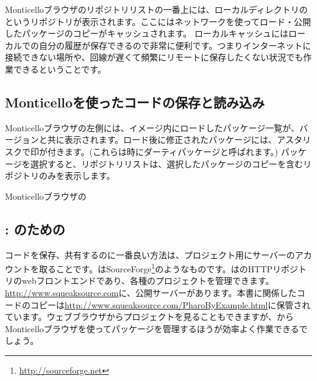 \documentclass[a4paper,10pt,twoside]{book}
\begin{document}
Monticelloブラウザのリポジトリリストの一番上には、ローカルディレクトリの というリポジトリが表示されます。ここにはネットワークを使ってロード・公開したパッケージのコピーがキャッシュされます。
ローカルキャッシュにはローカルでの自分の履歴が保存できるので非常に便利です。つまりインターネットに接続できない場所や、回線が遅くて頻繁にリモートに保存したくない状況でも作業できるということです。

\subsection{Monticelloを使ったコードの保存と読み込み}
Monticelloブラウザの左側には、イメージ内にロードしたパッケージ一覧が、バージョンと共に表示されます。ロード後に修正されたパッケージには、アスタリスクで印が付きます。(これらは時にダーティパッケージと呼ばれます。) パッケージを選択すると、リポジトリリストは、選択したパッケージのコピーを含むリポジトリのみを表示します。


Monticelloブラウザの

\subsection{\ind{\sqsrc}: \pharo のための}

コードを保存、共有するのに一番良い方法は、プロジェクト用に\sqsrc サーバーのアカウントを取ることです。\sqsrc はSourceForge\footnote{\url{http://sourceforge.net}}のようなものです。\sqsrc はのHTTPリポジトリのwebフロントエンドであり、各種のプロジェクトを管理できます。
\url{http://www.squeaksource.com}に、公開\sqsrc サーバーがあります。本書に関係したコードのコピーは\url{http://www.squeaksource.com/PharoByExample.html}に保管されています。ウェブブラウザからプロジェクトを見ることもできますが、\pharo からMonticelloブラウザを使ってパッケージを管理するほうが効率よく作業できるでしょう。

\end{document}
